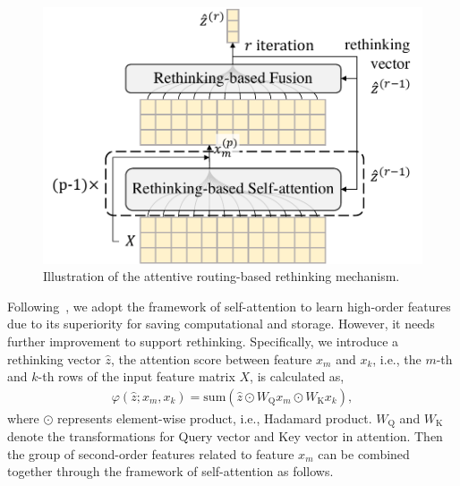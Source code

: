 \documentclass[11pt]{article}
\begin{document}
\setlength{\columnsep}{10pt}%
\begin{figure}
	\centering
	\includegraphics[width=\linewidth]{submissions/HyCLID/figures/routing.pdf}
	\caption{Illustration of the attentive routing-based rethinking mechanism. }
	\label{fig:routing}
\end{figure}
Following~\cite{song_autoint_2019,xu_disentangled_2021}, we adopt the framework of self-attention to learn high-order features due to its superiority for saving computational and storage. However, it needs further improvement to support rethinking. Specifically, we introduce a rethinking vector $ \hat{z} $, the attention score between feature $ x_m $ and $ x_k $, i.e., the $m$-th and $k$-th rows of the input feature matrix $X$, is calculated as,
\begin{align}
	\varphi(\hat{z}; x_m, x_k) = \text{sum} \left( \hat{z} \odot W_{\text{Q}} x_m \odot W_{\text{K}} x_k \right),  \label{eq:phi}
\end{align}
where $ \odot $ represents element-wise product, i.e., Hadamard product. $ W_{\text{Q}} $ and $ W_{\text{K}} $ denote the transformations for Query vector and Key vector in attention. Then the group of second-order features related to feature $ x_m $ can be combined together through the framework of self-attention as follows.
\end{document}
